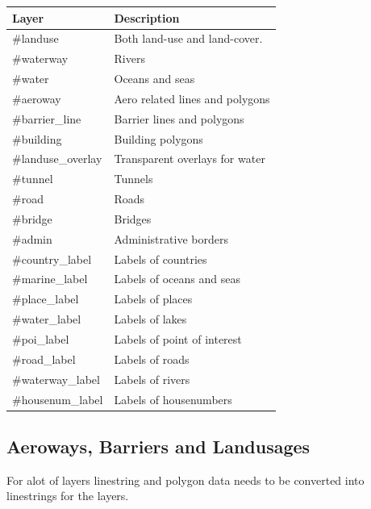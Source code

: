 \begin{flushleft}
    \begin{tabular}{ll}
    \hline
     Layer             & Description                     \\
    \hline
    \#landuse          & Both land-use and land-cover.   \\
    \#waterway         & Rivers                          \\
    \#water            & Oceans and seas                 \\
    \#aeroway          & Aero related lines and polygons \\
    \#barrier\_line    & Barrier lines and polygons      \\
    \#building         & Building polygons               \\
    \#landuse\_overlay & Transparent overlays for water  \\
    \#tunnel           & Tunnels                         \\
    \#road             & Roads                           \\
    \#bridge           & Bridges                         \\
    \#admin            & Administrative borders          \\
    \#country\_label   & Labels of countries             \\
    \#marine\_label    & Labels of oceans and seas       \\
    \#place\_label     & Labels of places                \\
    \#water\_label     & Labels of lakes                 \\
    \#poi\_label       & Labels of point of interest     \\
    \#road\_label      & Labels of roads                 \\
    \#waterway\_label  & Labels of rivers                \\
    \#housenum\_label  & Labels of housenumbers          \\
    \end{tabular}
\end{flushleft}

\newpage
\subsection{Aeroways, Barriers and Landusages}

For alot of layers linestring and polygon data needs to be converted into
linestrings for the layers.

